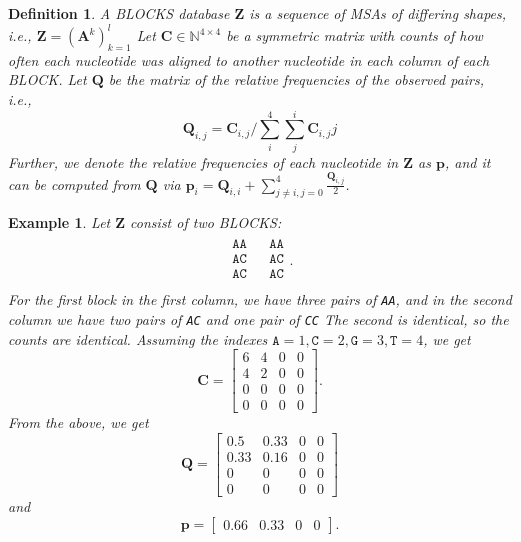 \documentclass{article}
\newtheorem{definition}{Definition}
\newtheorem{example}{Example}
\begin{document}
\begin{definition}
A BLOCKS database $\mathbf Z$ is a sequence of MSAs of differing shapes, i.e., $\mathbf Z = (\mathbf A^k)_{k=1}^l$
	Let $\mathbf C \in \mathbb N^{4 \times 4}$ be a symmetric matrix
with counts of how often each nucleotide was aligned to another nucleotide in each column of each BLOCK.
Let $\mathbf Q$ be the matrix of the relative frequencies of the observed pairs, i.e.,
\begin{equation*}
	 \mathbf Q_{i, j} = \mathbf C_{i, j} / \sum_i^4 \sum_j^i \mathbf C_{i, j}j
\end{equation*}
Further, we denote the relative frequencies of each nucleotide in $\mathbf Z$ as $\mathbf p$, and it can
be computed from $\mathbf Q$ via $\mathbf p_i = \mathbf Q_{i, i} + \sum_{j \ne i, j = 0}^4 \frac {\mathbf Q_{i, j}} {2}$.
\end{definition}
\begin{example}
	Let $\mathbf Z$ consist of two BLOCKS:
	\begin{equation*}
		\begin{matrix}
		\begin{matrix}
			\texttt{AA} \\
			\texttt{AC} \\
			\texttt{AC} \\
		\end{matrix} &
		\begin{matrix}
			\texttt{AA} \\
			\texttt{AC} \\
			\texttt{AC} \\
		\end{matrix}.
	\end{matrix}
	\end{equation*}
	For the first block in the first column, we have three pairs of \texttt{AA}, and in the second column we have two pairs of \texttt{AC} and one pair of \texttt{CC}
	The second  is identical, so the counts are identical. Assuming the indexes $\mathtt A = 1, \mathtt C = 2, \mathtt G = 3, \mathtt T = 4$, we get
	\begin{equation*}
		\mathbf C = \begin{bmatrix}
			6 & 4 & 0 & 0 \\
			4 & 2 & 0 & 0 \\
			0 & 0 & 0 & 0 \\
			0 & 0 & 0 & 0
		\end{bmatrix}.
	\end{equation*}
	From the above, we get
	\begin{equation*}
		\mathbf Q = \begin{bmatrix}
			0.5 & 0.33 & 0 & 0 \\
			0.33 & 0.16 & 0 & 0 \\
			0 & 0 & 0 & 0 \\
			0 & 0 & 0 & 0
		\end{bmatrix}
	\end{equation*}
	and
	\begin{equation*}
		\mathbf p = \begin{bmatrix}
			0.66 & 0.33 & 0 & 0
		\end{bmatrix}.
	\end{equation*}
\end{example}
\end{document}
